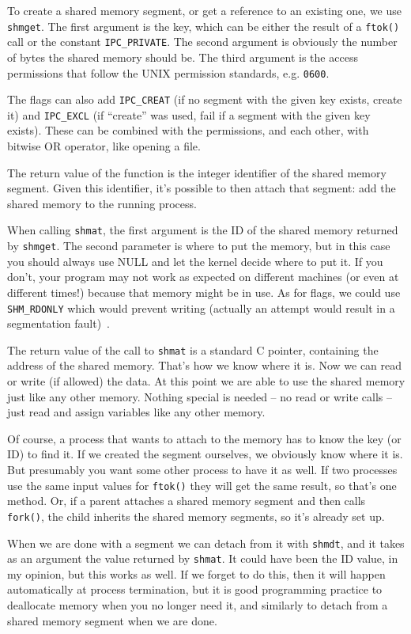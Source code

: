 To create a shared memory segment, or get a reference to an existing one, we use \texttt{shmget}. The first argument is the key, which can be either the result of a \texttt{ftok()} call or the constant \texttt{IPC\_PRIVATE}. The second argument is obviously the number of bytes the shared memory should be. The third argument is the access permissions that follow the UNIX permission standards, e.g. \texttt{0600}.

The flags can also add \texttt{IPC\_CREAT} (if no segment with the given key exists, create it) and \texttt{IPC\_EXCL} (if ``create'' was used, fail if a segment with the given key exists). These can be combined with the permissions, and each other, with bitwise OR operator, like opening a file.

The return value of the function is the integer identifier of the shared memory segment. Given this identifier, it's possible to then attach that segment: add the shared memory to the running process.

When calling \texttt{shmat}, the first argument is the ID of the shared memory returned by \texttt{shmget}. The second parameter is where to put the memory, but in this case you should always use NULL and let the kernel decide where to put it. If you don't, your program may not work as expected on different machines (or even at different times!) because that memory might be in use. As for flags, we could use \texttt{SHM\_RDONLY} which would prevent writing (actually an attempt would result in a segmentation fault)~\cite{lpi}.

The return value of the call to \texttt{shmat} is a standard C pointer, containing the address of the shared memory. That's how we know where it is. Now we can read or write (if allowed) the data. At this point we are able to use the shared memory just like any other memory. Nothing special is needed -- no read or write calls -- just read and assign variables like any other memory.

Of course, a process that wants to attach to the memory has to know the key (or ID) to find it. If we created the segment ourselves, we obviously know where it is. But presumably you want some other process to have it as well. If two processes use the same input values for \texttt{ftok()} they will get the same result, so that's one method. Or, if a parent attaches a shared memory segment and then calls \texttt{fork()}, the child inherits the shared memory segments, so it's already set up.

When we are done with a segment we can detach from it with \texttt{shmdt}, and it takes as an argument the value returned by \texttt{shmat}. It could have been the ID value, in my opinion, but this works as well. If we forget to do this, then it will happen automatically at process termination, but it is good programming practice to deallocate memory when you no longer need it, and similarly to detach from a shared memory segment when we are done.

